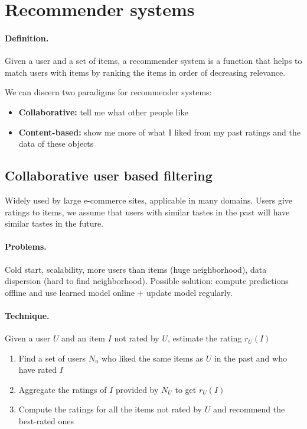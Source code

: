 
\section{Recommender systems}

\paragraph{Definition.} Given a user and a set of items, a recommender system is a function that helps to match users with items by ranking the items in order of decreasing relevance.

We can discern two paradigms for recommender systems: 
\begin{itemize}
  \item \textbf{Collaborative:} tell me what other people like
  \item \textbf{Content-based:} show me more of what I liked from my past ratings and the data of these objects
\end{itemize}

\subsection{Collaborative user based filtering}

Widely used by large e-commerce sites, applicable in many domains. Users give ratings to items, we assume that users with similar tastes in the past will have similar tastes in the future.

\paragraph{Problems.} Cold start, scalability, more users than items (huge neighborhood), data dispersion (hard to find neighborhood). Possible solution: compute predictions offline and use learned model online + update model regularly.

\paragraph{Technique.} Given a user $U$ and an item $I$ not rated by $U$, estimate the rating $r_U(I)$

\begin{enumerate}
  \item Find a set of users $N_u$ who liked the same items as $U$ in the past and who have rated $I$
  \item Aggregate the ratings of $I$ provided by $N_U$ to get $r_U(I)$
  \item Compute the ratings for all the items not rated by $U$ and recommend the best-rated ones 
\end{enumerate}

